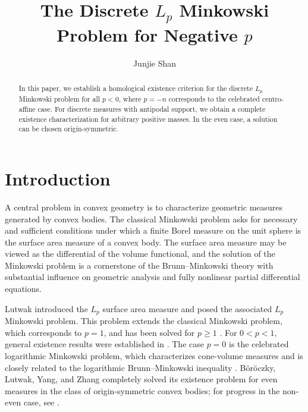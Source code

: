 \documentclass[12pt,reqno]{amsart}
\title[The Discrete $L_p$ Minkowski Problem  for Negative $p$]{The Discrete $L_p$ Minkowski Problem  for Negative $p$}
\author{Junjie Shan}
\date{}
\numberwithin{equation}{section}
\theoremstyle{remark}
\begin{document}
\begin{abstract}

	In this paper, we establish a homological existence criterion for
	the discrete $L_p$ Minkowski problem for all $p<0$, where $p=-n$
	corresponds to the celebrated centro-affine case. For discrete measures with antipodal support, we obtain a complete
	existence characterization for arbitrary positive masses. In the even case, a solution can be chosen
	origin-symmetric.


\end{abstract}
\maketitle


\section{Introduction}

A central problem in convex geometry is to characterize geometric measures generated by convex bodies. The classical Minkowski problem asks for necessary and sufficient conditions under which a finite Borel measure on the unit sphere is the surface area measure of a convex body. The surface area measure may be viewed as the differential of the volume functional, and the solution of the Minkowski problem is a cornerstone of the Brunn--Minkowski theory with substantial influence on geometric analysis and fully nonlinear partial differential equations. 

Lutwak \cite{Lutwak} introduced the $L_p$ surface area measure
and posed the associated $L_p$ Minkowski problem.
This problem extends the classical Minkowski problem, which
corresponds to $p=1$, and has been  solved for $p\ge1$
\cite{ChouWang,HugLutwakYangZhang,Lutwak,LutwakYangZhang}.
For $0<p<1$, general existence results were established in
\cite{BianchiBoroczkyColesantiYang,ChenLiZhuMongeAmpere}.
The case $p=0$ is the celebrated logarithmic Minkowski problem,
which characterizes cone-volume measures and is closely related
to the logarithmic Brunn--Minkowski inequality
\cite{BoroczkyLutwakYangZhangLogBM}.
B\"or\"oczky, Lutwak, Yang, and Zhang
\cite{BoroczkyLutwakYangZhangLogM} completely solved its existence
problem for even measures in the class of origin-symmetric
convex bodies; for progress in the non-even case, see
\cite{BoroczkyHegedusZhu,ChenLiZhuLog,StancuDiscrete,ZhuLog}.
\end{document}
